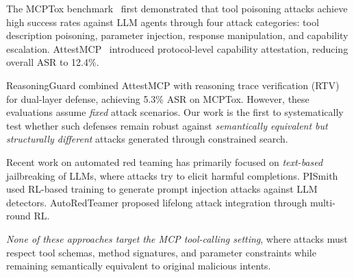 The MCPTox benchmark~\cite{wang2026mcptox} first demonstrated that tool poisoning attacks achieve high success rates against LLM agents through four attack categories: tool description poisoning, parameter injection, response manipulation, and capability escalation.
AttestMCP~\cite{maloyan2026breaking} introduced protocol-level capability attestation, reducing overall ASR to 12.4\%.

ReasoningGuard combined AttestMCP with reasoning trace verification (RTV) for dual-layer defense, achieving 5.3\% ASR on MCPTox. 
However, these evaluations assume \textit{fixed} attack scenarios. Our work is the first to systematically test whether such defenses remain robust against \textit{semantically equivalent but structurally different} attacks generated through constrained search.

Recent work on automated red teaming has primarily focused on \textit{text-based} jailbreaking of LLMs, where attacks try to elicit harmful completions.
PISmith~\cite{yin2026pismith} used RL-based training to generate prompt injection attacks against LLM detectors.
AutoRedTeamer proposed lifelong attack integration through multi-round RL.

\textit{None of these approaches target the MCP tool-calling setting}, where attacks must respect tool schemas, method signatures, and parameter constraints while remaining semantically equivalent to original malicious intents.